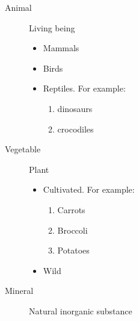 \begin{result}
\begin{description}

   \item[Animal] Living being

   \begin{itemize}

      \item Mammals

      \item Birds

      \item Reptiles. For example:
      \begin{enumerate}

         \item dinosaurs

         \item crocodiles

       \end{enumerate}

   \end{itemize}

   \item[Vegetable] Plant

   \begin{itemize}

      \item Cultivated. For example:

      \begin{enumerate}

         \item Carrots

         \item Broccoli

         \item Potatoes

      \end{enumerate}


      \item Wild

   \end{itemize}

   \item[Mineral] Natural inorganic substance

\end{description}
\end{result}

